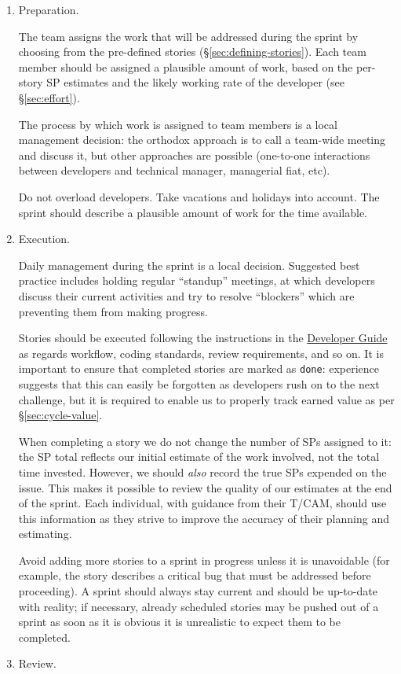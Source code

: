 \begin{enumerate}
\item Preparation.

  The team assigns the work that will be addressed during the sprint by choosing from the pre-defined stories (\S\ref{sec:defining-stories}).
  Each team member should be assigned a plausible amount of work, based on the per-\gls{story} \gls{SP} estimates and the likely working rate of the developer (see \S\ref{sec:effort}).

  The process by which work is assigned to team members is a local
  management decision: the orthodox approach is to call a team-wide
  meeting and discuss it, but other approaches are possible (one-to-one
  interactions between developers and technical manager, managerial
  fiat, etc).

  Do not overload developers. Take vacations and holidays into account.
  The sprint should describe a plausible amount of work for the time
  available.
\item Execution.

  Daily management during the sprint is a local decision. Suggested best
  practice includes holding regular ``standup'' meetings, at which
  developers discuss their current activities and try to resolve
  ``blockers'' which are preventing them from making progress.

  Stories should be executed following the instructions in the
  \href{http://developer.lsst.io/}{Developer Guide} as regards workflow,
  coding standards, review requirements, and so on. It is important to
  ensure that completed stories are marked as \texttt{done}:
  experience suggests that this can easily be forgotten as developers
  rush on to the next challenge, but it is required to enable us to
  properly track earned value as per \S\ref{sec:cycle-value}.

  When completing a \gls{story} we do not change the number of \glspl{SP} assigned to
  it: the \gls{SP} total reflects our initial estimate of the work involved,
  not the total time invested.
  However, we should \textit{also} record the true \glspl{SP} expended on the issue.
  This makes it possible to review the quality of our estimates at the end of the sprint.
  Each individual, with guidance from their \gls{T/CAM}, should use this information as they strive to improve the accuracy of their planning and estimating.

  Avoid adding more stories to a sprint in progress unless it is
  unavoidable (for example, the \gls{story} describes a critical bug that must
  be addressed before proceeding). A sprint should always stay current
  and should be up-to-date with reality; if necessary, already scheduled
  stories may be pushed out of a sprint as soon as it is obvious it is
  unrealistic to expect them to be completed.
\item \gls{Review}.


\end{enumerate}
